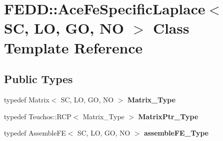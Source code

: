 \hypertarget{classFEDD_1_1AceFeSpecificLaplace}{}\section{F\+E\+DD\+:\+:Ace\+Fe\+Specific\+Laplace$<$ SC, LO, GO, NO $>$ Class Template Reference}
\label{classFEDD_1_1AceFeSpecificLaplace}
\subsection*{Public Types}
\begin{DoxyCompactItemize}
\item 
\mbox{\label{classFEDD_1_1AceFeSpecificLaplace_a19d369d09142384188a6a807818c69c7}} 
typedef Matrix$<$ SC, LO, GO, NO $>$ {\bfseries Matrix\+\_\+\+Type}
\item 
\mbox{\label{classFEDD_1_1AceFeSpecificLaplace_a60b688da92138fd40371db8d248c9b38}} 
typedef Teuchos\+::\+R\+CP$<$ Matrix\+\_\+\+Type $>$ {\bfseries Matrix\+Ptr\+\_\+\+Type}
\item 
\mbox{\label{classFEDD_1_1AceFeSpecificLaplace_a4f5b8d0edefa484c55aea4cfd2821e80}} 
typedef Assemble\+FE$<$ SC, LO, GO, NO $>$ {\bfseries assemble\+F\+E\+\_\+\+Type}
\end{DoxyCompactItemize}
